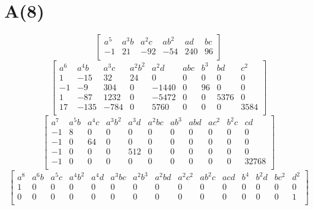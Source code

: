 \documentclass[10pt]{amsart}
\begin{document}
\section*{A(8)}
\[ \begin{bmatrix}
a^{5} & a^{3}b & a^{2}c & ab^{2} & ad & bc \\
-1 & 21 & -92 & -54 & 240 & 96 \\
\end{bmatrix} \]
\[ \begin{bmatrix}
a^{6} & a^{4}b & a^{3}c & a^{2}b^{2} & a^{2}d & abc & b^{3} & bd & c^{2} \\
1 & -15 & 32 & 24 & 0 & 0 & 0 & 0 & 0 \\
-1 & -9 & 304 & 0 & -1440 & 0 & 96 & 0 & 0 \\
1 & -87 & 1232 & 0 & -5472 & 0 & 0 & 5376 & 0 \\
17 & -135 & -784 & 0 & 5760 & 0 & 0 & 0 & 3584 \\
\end{bmatrix} \]
\[ \begin{bmatrix}
a^{7} & a^{5}b & a^{4}c & a^{3}b^{2} & a^{3}d & a^{2}bc & ab^{3} & abd & ac^{2} & b^{2}c & cd \\
-1 & 8 & 0 & 0 & 0 & 0 & 0 & 0 & 0 & 0 & 0 \\
-1 & 0 & 64 & 0 & 0 & 0 & 0 & 0 & 0 & 0 & 0 \\
-1 & 0 & 0 & 0 & 512 & 0 & 0 & 0 & 0 & 0 & 0 \\
-1 & 0 & 0 & 0 & 0 & 0 & 0 & 0 & 0 & 0 & 32768 \\
\end{bmatrix} \]
\[ \begin{bmatrix}
a^{8} & a^{6}b & a^{5}c & a^{4}b^{2} & a^{4}d & a^{3}bc & a^{2}b^{3} & a^{2}bd & a^{2}c^{2} & ab^{2}c & acd & b^{4} & b^{2}d & bc^{2} & d^{2} \\
1 & 0 & 0 & 0 & 0 & 0 & 0 & 0 & 0 & 0 & 0 & 0 & 0 & 0 & 0 \\
0 & 0 & 0 & 0 & 0 & 0 & 0 & 0 & 0 & 0 & 0 & 0 & 0 & 0 & 1 \\
\end{bmatrix} \]
\end{document}
